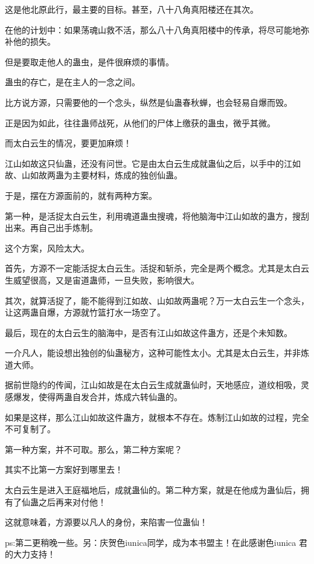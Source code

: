 \begin{this_body}
这是他北原此行，最主要的目标。甚至，八十八角真阳楼还在其次。

在他的计划中：如果荡魂山救不活，那么八十八角真阳楼中的传承，将尽可能地弥补他的损失。

但是要取走他人的蛊虫，是件很麻烦的事情。

蛊虫的存亡，是在主人的一念之间。

比方说方源，只需要他的一个念头，纵然是仙蛊春秋蝉，也会轻易自爆而毁。

正是因为如此，往往蛊师战死，从他们的尸体上缴获的蛊虫，微乎其微。

而太白云生的情况，要更加麻烦！

江山如故这只仙蛊，还没有问世。它是由太白云生成就蛊仙之后，以手中的江如故、山如故两蛊为主要材料，炼成的独创仙蛊。

于是，摆在方源面前的，就有两种方案。

第一种，是活捉太白云生，利用魂道蛊虫搜魂，将他脑海中江山如故的蛊方，搜刮出来。再自己出手炼制。

这个方案，风险太大。

首先，方源不一定能活捉太白云生。活捉和斩杀，完全是两个概念。尤其是太白云生威望很高，又是宙道蛊师，一旦失败，影响很大。

其次，就算活捉了，能不能得到江如故、山如故两蛊呢？万一太白云生一个念头，让这两蛊自爆，方源就竹篮打水一场空了。

最后，现在的太白云生的脑海中，是否有江山如故这件蛊方，还是个未知数。

一介凡人，能设想出独创的仙蛊秘方，这种可能性太小。尤其是太白云生，并非炼道大师。

据前世隐约的传闻，江山如故是在太白云生成就蛊仙时，天地感应，道纹相吸，灵感爆发，使得两蛊自发合并，炼成六转仙蛊的。

如果是这样，那么江山如故这件蛊方，就根本不存在。炼制江山如故的过程，完全不可复制了。

第一种方案，并不可取。那么，第二种方案呢？

其实不比第一方案好到哪里去！

太白云生是进入王庭福地后，成就蛊仙的。第二种方案，就是在他成为蛊仙后，拥有了仙蛊之后再来对付他！

这就意味着，方源要以凡人的身份，来陷害一位蛊仙！

ps:第二更稍晚一些。另：庆贺色iunica同学，成为本书盟主！在此感谢色iunica 君的大力支持！

\end{this_body}

